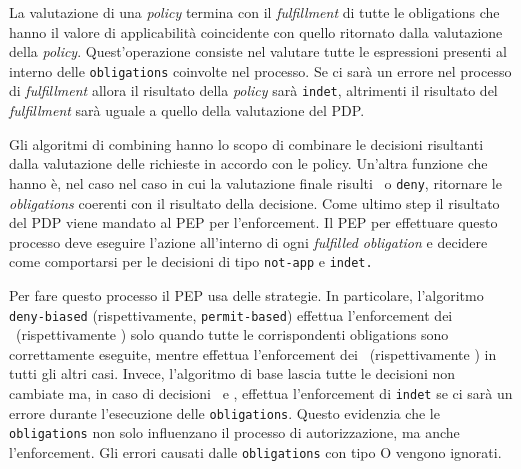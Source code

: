 La valutazione di una \textit{policy} termina con il \textit{fulfillment} di tutte le obligations  che hanno il valore di applicabilità coincidente con quello ritornato dalla valutazione della \textit{policy}. Quest'operazione consiste nel valutare tutte le espressioni presenti al interno delle \texttt{obligations} coinvolte nel processo. Se ci sarà un errore nel processo di \textit{fulfillment} allora il risultato della \textit{policy} sarà \texttt{indet}, altrimenti il risultato del \textit{fulfillment} sarà uguale a quello della valutazione del PDP.\\ \par
Gli algoritmi di combining hanno lo scopo di combinare le decisioni risultanti dalla valutazione delle richieste in accordo con le policy. Un'altra funzione che hanno è, nel caso nel caso in cui la valutazione finale risulti \permit \ o \texttt{deny}, ritornare le \textit{obligations} coerenti con il risultato della decisione.  
Come ultimo step il risultato del PDP viene mandato al PEP per l'enforcement.
Il PEP per effettuare questo processo deve eseguire l'azione all'interno di ogni \textit{fulfilled obligation} e decidere come comportarsi per le decisioni di tipo \texttt{not-app} e \texttt{indet.}\\ \par
Per fare questo processo il \ac{PEP} usa delle strategie. In particolare, l'algoritmo \texttt{deny-biased} (rispettivamente, \texttt{permit-based}) effettua l'enforcement dei \permit \ (rispettivamente \deny) solo quando tutte le corrispondenti obligations sono correttamente eseguite, mentre effettua l'enforcement dei \deny \  (rispettivamente \permit) in tutti gli altri casi. Invece, l'algoritmo di base lascia tutte le decisioni non cambiate ma, in caso di decisioni \permit \ e \deny, effettua l'enforcement di \texttt{indet} se ci sarà un errore durante l'esecuzione delle \texttt{obligations}. Questo evidenzia che le \texttt{obligations} non solo influenzano il processo di autorizzazione, ma anche l'enforcement. Gli errori causati dalle \texttt{obligations} con tipo O vengono ignorati.

